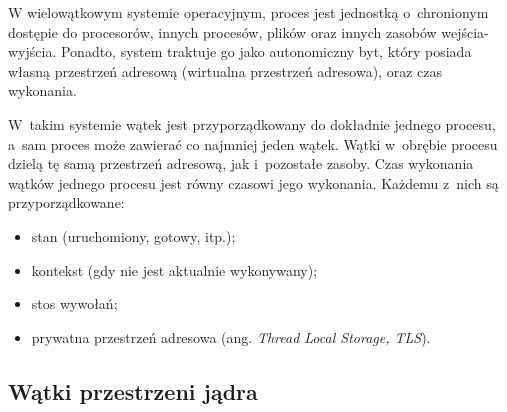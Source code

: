 \documentclass{mwart}
\begin{document}
\indent
	W wielowątkowym systemie operacyjnym, proces jest jednostką o~chronionym dostępie do 
	procesorów, innych procesów, plików oraz innych zasobów wejścia-wyjścia. Ponadto, system
	traktuje go jako autonomiczny byt, który posiada własną przestrzeń adresową (wirtualna 
	przestrzeń adresowa), oraz czas wykonania.
\par
%
\indent
	W~takim systemie wątek jest przyporządkowany do dokładnie jednego procesu, a~sam proces 
	może zawierać co najmniej jeden wątek. Wątki w~obrębie procesu dzielą tę samą przestrzeń
	adresową, jak i~pozostałe zasoby. Czas wykonania wątków jednego procesu jest równy czasowi
	jego wykonania. Każdemu z~nich są przyporządkowane:
	\begin{itemize}
	\item stan (uruchomiony, gotowy, itp.);
	\item kontekst (gdy nie jest aktualnie wykonywany);
	\item stos wywołań;
	\item prywatna przestrzeń adresowa (ang. \emph{Thread Local Storage, TLS}).
	\end{itemize}
\par
\subsection{Wątki przestrzeni jądra}
\end{document}
